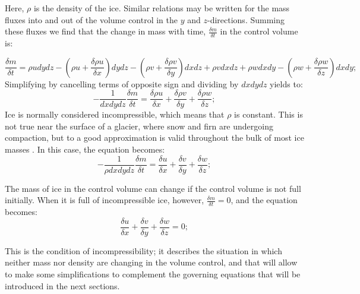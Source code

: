 \documentclass{article}
\begin{document}
Here, $\rho$ is the density of the ice. Similar relations may be written for the mass fluxes into and out of the volume control in the $y$ and $z$-directions. Summing these fluxes we find that the change in mass with time, $\frac{\delta m}{\delta t}$ in the control volume is:

\begin{equation}
	\frac{\delta m}{\delta t}=\rho u dydz-({\rho u+\frac{\delta \rho u}{\delta x}})dydz-({\rho v+\frac{\delta \rho v}{\delta y}})dxdz+\rho vdxdz+\rho wdxdy-({\rho w+\frac{\delta \rho w}{\delta z}})dxdy;
\end{equation}
Simplifying by cancelling terms of opposite sign and dividing by $dxdydz$ yields to:
\begin{equation}
	-\frac{1}{dxdydz}\frac{\delta m}{\delta t}=\frac{\delta \rho u}{\delta x}+\frac{\delta \rho v}{\delta y}+\frac{\delta \rho w}{\delta z};
\end{equation}
Ice is normally considered incompressible, which means that $\rho$ is constant. This is not true near the surface of a glacier, where snow and firn are undergoing compaction, but to a good approximation is valid throughout the bulk of most ice masses \cite[]{hooke2019principles}. In this case, the equation becomes:
\begin{equation}
	-\frac{1}{\rho dxdydz}\frac{\delta m}{\delta t}=\frac{\delta u}{\delta x}+\frac{\delta v}{\delta y}+\frac{\delta w}{\delta z};
\end{equation}

The mass of ice in the control volume can change if the control volume is not full initially. When it is full of incompressible ice, however, $\frac{\delta m}{\delta t}=0$, and the equation becomes:
\begin{equation}
	\frac{\delta u}{\delta x}+\frac{\delta v}{\delta y}+\frac{\delta w}{\delta z}=0;
\end{equation}

This is the condition of incompressibility; it describes the situation in which neither mass nor density are changing in the volume control, and that will allow to make some simplifications to complement the governing equations that will be introduced in the next sections. 
\end{document}

